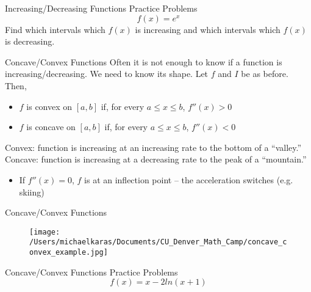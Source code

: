 \documentclass[aspectratio=169]{beamer}
\begin{document}
\begin{frame}{Increasing/Decreasing Functions Practice Problems}\label{main1}
	\vspace{-4cm}
     \[
    f(x) = e^{x}
    \]
    Find which intervals which \( f(x) \) is increasing and which intervals which \( f(x) \) is decreasing.
\end{frame}

\begin{frame}{Concave/Convex Functions}\label{main1}
    Often it is not enough to know if a function is increasing/decreasing. We need to know its shape. Let $f$ and $I$ be as before. Then,
    \begin{itemize}
        \item $f$ is convex on $[a, b]$ if, for every $a \leq x \leq b$, $f''(x) > 0$
        \item $f$ is concave on $[a, b]$ if, for every $a \leq x \leq b$, $f''(x) < 0$
    \end{itemize}
    Convex: function is increasing at an increasing rate to the bottom of a “valley.” Concave: function is increasing at a decreasing rate to the peak of a “mountain.”
    \begin{itemize}
        \item If $f''(x) = 0$, $f$ is at an inflection point – the acceleration switches (e.g. skiing)
    \end{itemize}
\end{frame}

\begin{frame}{Concave/Convex Functions}\label{main1}
    \begin{figure}
        \centering
        \texttt{[image: /Users/michaelkaras/Documents/CU\_Denver\_Math\_Camp/concave\_convex\_example.jpg]}
    \end{figure}
\end{frame}

\begin{frame}{Concave/Convex Functions Practice Problems}\label{main1}
	\vspace{-4cm}
     \[
    f(x) = x - 2ln(x+1)
    \]
\end{frame}
\end{document}

